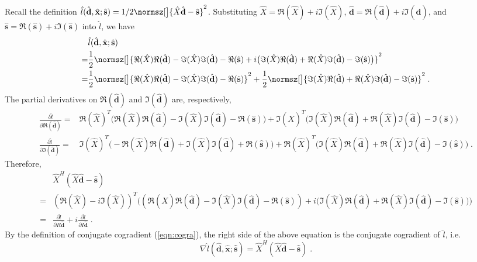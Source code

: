 \documentclass[final]{siamart1116}
\newcommand{\mb}[1]{\mathbf{#1}}
\begin{document}
Recall the definition $\hat{l}(\hat{\mb{d}},\hat{\mb{x}};\hat{\mb{s}}) = 1/2\normsz[\big]{\hat{X}\hat{\mb{d}}-\hat{\mb{s}}}^2$. Substituting $\hat{X} = \Re(\hat{X}) + i \Im(\hat{X})$, $\hat{\mb{d}}=\Re(\hat{\mb{d}})+i \Im(\hat{\mb{d}})$, and $\hat{\mb{s}} = \Re(\hat{\mb{s}}) + i \Im(\hat{\mb{s}})$ into $\hat{l}$, we have
\[
\begin{aligned}
&\hat{l}(\hat{\mb{d}},\hat{\mb{x}};\hat{\mb{s}})  \\
=& \frac{1}{2}\normsz[\big]{\Re(\hat{X})\Re(\hat{\mb{d}}) - \Im(\hat{X})\Im(\hat{\mb{d}})-\Re(\hat{\mb{s}}) + i\big(\Im(\hat{X})\Re(\hat{\mb{d}})+ \Re(\hat{X}) \Im(\hat{\mb{d}}) - \Im(\hat{\mb{s}})\big)}^2\\
=&\frac{1}{2}\normsz[\big]{\Re(\hat{X})\Re(\hat{\mb{d}}) - \Im(\hat{X})\Im(\hat{\mb{d}}) - \Re(\hat{\mb{s}})}^2 + \frac{1}{2} \normsz[\big]{\Im(\hat{X})\Re(\hat{\mb{d}}) + \Re(\hat{X}) \Im(\hat{\mb{d}}) - \Im(\hat{\mb{s}})}^2 \;.
\end{aligned}
\]
The partial derivatives on $\Re(\hat{\mb{d}})$ and $\Im(\hat{\mb{d}})$ are, respectively,
\[
\begin{aligned}
\frac{\partial \hat{l}}{\partial \Re(\hat{\mb{d}})} =&  \Re(\hat{X})^T \big(\Re(\hat{X})\Re(\hat{\mb{d}}) - \Im(\hat{X})\Im(\hat{\mb{d}})-\Re(\hat{\mb{s}})\big) + \Im(\hat{X})^T \big(\Im(\hat{X})\Re(\hat{\mb{d}}) + \Re(\hat{X}) \Im(\hat{\mb{d}}) - \Im(\hat{\mb{s}})\big)\\
\frac{\partial \hat{l}}{\partial \Im(\hat{\mb{d}})} = & \Im(\hat{X})^T \big(-\Re(\hat{X})\Re(\hat{\mb{d}}) + \Im(\hat{X})\Im(\hat{\mb{d}}) + \Re(\hat{\mb{s}})\big)  + \Re(\hat{X})^T \big(\Im(\hat{X})\Re(\hat{\mb{d}}) + \Re(\hat{X}) \Im(\hat{\mb{d}}) - \Im(\hat{\mb{s}})\big) \;.
\end{aligned}
\]
Therefore,
\[
\begin{aligned}
&\hat{X}^H(\hat{X}\hat{\mb{d}}-\hat{\mb{s}})\\ = & (\Re(\hat{X}) - i \Im(\hat{X}))^T \Big( (\Re(\hat{X})\Re(\hat{\mb{d}}) - \Im(\hat{X})\Im(\hat{\mb{d}})-\Re(\hat{\mb{s}}))+ i \big( \Im(\hat{X})\Re(\hat{\mb{d}}) + \Re(\hat{X}) \Im(\hat{\mb{d}}) - \Im(\hat{\mb{s}}) \big) \Big)\\ = & \frac{\partial \hat{l}}{\partial R\hat{\mb{d}}} + i \frac{\partial \hat{l}}{\partial I\hat{\mb{d}}} \;.
\end{aligned}
\]
By the definition of conjugate cogradient (\ref{eqn:cogra}), the right side of the above equation is the conjugate cogradient of $\hat{l}$, i.e.
\[
\nabla \hat{l}(\hat{\mb{d}},\hat{\mb{x}};\hat{\mb{s}}) = \hat{X}^H(\hat{X}\hat{\mb{d}}-\hat{\mb{s}}) \;.
\]
\end{document}
